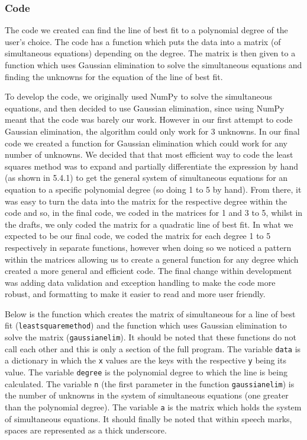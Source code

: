 \documentclass{article}
\begin{document}
\subsubsection{Code}
The code we created can find the line of best fit to a polynomial degree of the user's choice. The code has a function which puts the data into a matrix (of simultaneous equations) depending on the degree. The matrix is then given to a function which uses Gaussian elimination to solve the simultaneous equations and finding the unknowns for the equation of the line of best fit. 

To develop the code, we originally used NumPy to solve the simultaneous equations, and then decided to use Gaussian elimination, since using NumPy meant that the code was barely our work. However in our first attempt to code Gaussian elimination, the algorithm could only work for 3 unknowns. In our final code we created a function for Gaussian elimination which could work for any number of unknowns. We decided that that most efficient way to code the least squares method was to expand and partially differentiate the expression by hand (as shown in 5.4.1) to get the general system of simultaneous equations for an equation to a specific polynomial degree (so doing 1 to 5 by hand). From there, it was easy to turn the data into the matrix for the respective degree within the code and so, in the final code, we coded in the matrices for 1 and 3 to 5, whilst in the drafts, we only coded the matrix for a quadratic line of best fit. In what we expected to be our final code, we coded the matrix for each degree 1 to 5 respectively in separate functions, however when doing so we noticed a pattern within the matrices allowing us to create a general function for any degree which created a more general and efficient code. The final change within development was adding data validation and exception handling to make the code more robust, and formatting to make it easier to read and more user friendly. 

Below is the function which creates the matrix of simultaneous for a line of best fit (\texttt{leastsquaremethod}) and the function which uses Gaussian elimination to solve the matrix (\texttt{gaussianelim}). It should be noted that these functions do not call each other and this is only a section of the full program. The variable \texttt{data} is a dictionary in which the \texttt{x} values are the keys with the respective \texttt{y} being its value. The variable \texttt{degree} is the polynomial degree to which the line is being calculated. The variable \texttt{n} (the first parameter in the function \texttt{gaussianelim}) is the number of unknowns in the system of simultaneous equations (one greater than the polynomial degree). The variable \texttt{a} is the matrix which holds the system of simultaneous equations. It should finally be noted that within speech marks, spaces are represented as a thick underscore.
\end{document}
